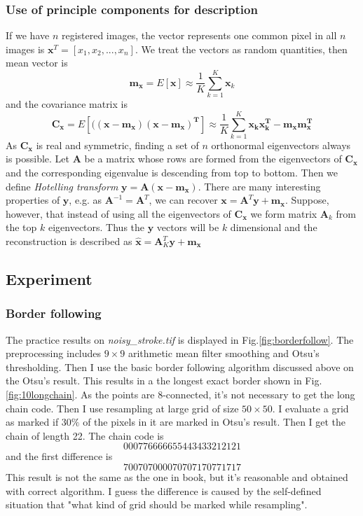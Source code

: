 \subsubsection{Use of principle components for description}
If we have $n$ registered images, the vector represents one common pixel in all $n$ images is $\mathbf{x}^T=[x_1, x_2,..., x_n]$. We treat the vectors as random quantities, then mean vector is \begin{equation}\mathbf{m_x}=E[\mathbf{x}]\approx \frac{1}{K}\sum_{k=1}^K\mathbf{x}_k\end{equation} and the covariance matrix is \begin{equation} \mathbf{C_x}=E\left[(\mathbf{(x-m_x)(x-m_x)^T} \right] \approx \frac{1}{K}\sum_{k=1}^K\mathbf{x_kx_k^T-m_xm_x^T}\end{equation}As $\mathbf{C_x}$ is real and symmetric, finding a set of $n$ orthonormal eigenvectors always is possible. Let $\mathbf{A}$ be a matrix whose rows are formed from the eigenvectors of $\mathbf{C_x}$ and the corresponding eigenvalue is descending from top to bottom. Then we define \emph{Hotelling transform} $\mathbf{y=A(x-m_x)}$. There are many interesting properties of $\mathbf{y}$, e.g. as $\mathbf{A}^{-1}=\mathbf{A}^T$, we can recover $\mathbf{x}=\mathbf{A}^T\mathbf{y}+\mathbf{m_x}$. Suppose, however, that instead of using all the eigenvectors of $\mathbf{C_x}$  we form matrix $\mathbf{A}_k$ from the top $k$ eigenvectors. Thus the $\mathbf{y}$ vectors will be $k$ dimensional and the reconstruction is described as $\hat{\mathbf{x}}=\mathbf{A}_K^T\mathbf{y}+\mathbf{m_x}$

\subsection{Experiment}
\subsubsection{Border following}
The practice results on \emph{noisy\_stroke.tif} is displayed in Fig.\ref{fig:borderfollow}. The preprocessing includes $9\times 9$ arithmetic mean filter smoothing and Otsu's thresholding. Then I use the basic border following algorithm discussed above on the Otsu's result. This results in a the longest exact border shown in Fig.\ref{fig:10longchain}. As the points are 8-connected, it's not necessary to get the long chain code. Then I use resampling at large grid of size $50\times 50$. I evaluate a grid as marked if $30\%$ of the pixels in it are marked in Otsu's result. Then I get the chain of length 22. The chain code is \begin{equation}000776666655443433212121\end{equation} and the first difference is \begin{equation}700707000070707170771717\end{equation} This result is not the same as the one in book, but it's reasonable and obtained with correct algorithm. I guess the difference is caused by the self-defined situation that "what kind of grid should be marked while resampling".


